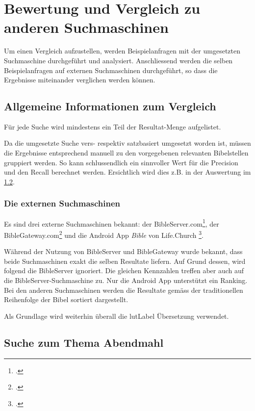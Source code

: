 \chapter{Bewertung und Vergleich zu anderen Suchmaschinen}
 \label{sec:compareSearches}
Um einen Vergleich aufzustellen, werden Beispielanfragen mit der umgesetzten Suchmaschine durchgeführt und analysiert.
Anschliessend werden die selben Beispielanfragen auf externen Suchmaschinen durchgeführt, so dass die Ergebnisse miteinander verglichen werden können.

\section{Allgemeine Informationen zum Vergleich}
Für jede Suche wird mindestens ein Teil der Resultat-Menge aufgelistet.

Da die umgesetzte Suche vers- respektiv satzbasiert umgesetzt worden ist, müssen die Ergebnisse entsprechend manuell zu den vorgegebenen relevanten Bibelstellen gruppiert werden.
So kann schlussendlich ein sinnvoller Wert für die Precision und den Recall berechnet werden.
Ersichtlich wird dies z.B. in der Auswertung im \cref{sec:index_abendmahl}.


\subsection{Die externen Suchmaschinen}
Es sind drei externe Suchmaschinen bekannt: der BibleServer.com\footcite{BibleServer_Die_Bibel_fr_alle_2016-05-30}, der BibleGateway.com\footcite{BibleGateway_2016-05-30} und die Android App \textit{Bible} von Life.Church \footcite{Bible_Android_Apps_on_Google_Play_2016-05-30}.

Während der Nutzung von BibleServer und BibleGateway wurde bekannt, dass beide Suchmaschinen exakt die selben Resultate liefern.
Auf Grund dessen, wird folgend die BibleServer ignoriert. Die gleichen Kennzahlen treffen aber auch auf die BibleServer-Suchmaschine zu.
Nur die Android App unterstützt ein Ranking. Bei den anderen Suchmaschinen werden die Resultate gemäss der traditionellen Reihenfolge der Bibel sortiert dargestellt.

Als Grundlage wird weiterhin überall die \gls{lutLabel} Übersetzung verwendet.



\newpage
\section{Suche zum Thema Abendmahl}
\label{sec:index_abendmahl}

